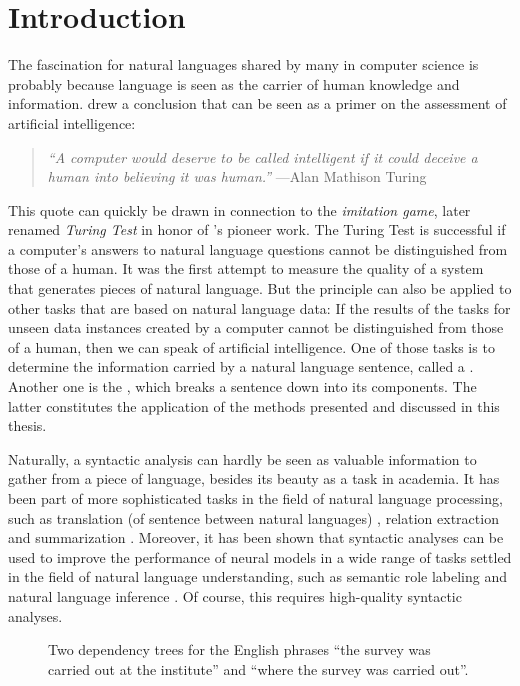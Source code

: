 \documentclass[../document.tex]{subfiles}
\begin{document}
    \chapter{Introduction}
    The fascination for natural languages shared by many in computer science is probably because language is seen as the carrier of human knowledge and information.
     drew a conclusion that can be seen as a primer on the assessment of artificial intelligence:
    \begin{quote}
        \emph{``A computer would deserve to be called intelligent if it could deceive a human into believing it was human.''} \hfill ---Alan Mathison Turing
    \end{quote}
    This quote can quickly be drawn in connection to the \emph{imitation game}, later renamed \emph{Turing Test} in honor of \citeauthor{Turing2009}'s pioneer work.
    The Turing Test is successful if a computer's answers to natural language questions cannot be distinguished from those of a human.
    It was the first attempt to measure the quality of a system that generates pieces of natural language.
    But the principle can also be applied to other tasks that are based on natural language data:
        If the results of the tasks for unseen data instances created by a computer cannot be distinguished from those of a human, then we can speak of artificial intelligence.
    One of those tasks is to determine the information carried by a natural language sentence, called a .
    Another one is the , which breaks a sentence down into its components.
    The latter constitutes the application of the methods presented and discussed in this thesis.

    Naturally, a syntactic analysis can hardly be seen as valuable information to gather from a piece of language, besides its beauty as a task in academia.
    It has been part of more sophisticated tasks in the field of natural language processing, such as translation (of sentence between natural languages) \citep{Zhang19,Yang22}, relation extraction \citep{Ngu19} and summarization \citep{Bal21}.
    Moreover, it has been shown that syntactic analyses can be used to improve the performance of neural models in a wide range of tasks settled in the field of natural language understanding, such as semantic role labeling and natural language inference \citep{Liu19, Wang19, Fei20}.
    Of course, this requires high-quality syntactic analyses.

    \begin{figure}
        \null\hfill
        
        \hfill
        
        \hfill\null
        \caption{\label{fig:dependency}
            Two dependency trees for the English phrases ``the survey was carried out at the institute'' and ``where the survey was carried out''.
        }
    \end{figure}
\end{document}
